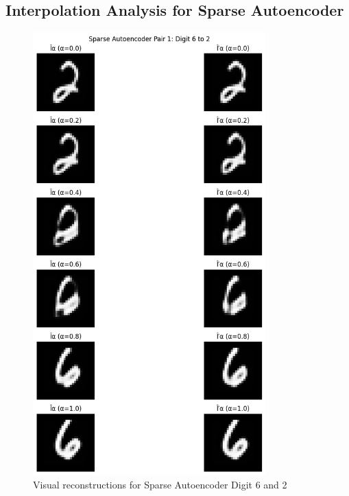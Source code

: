 \documentclass[12pt]{article}
\begin{document}
\subsection*{Interpolation Analysis for Sparse Autoencoder}
\begin{figure}
\centering
\includegraphics[width=0.8\textwidth,height=0.8\textheight,keepaspectratio]{sparse_autoencoder_1.png}
\caption{Visual reconstructions for Sparse Autoencoder Digit 6 and 2}
\end{figure}
\end{document}
